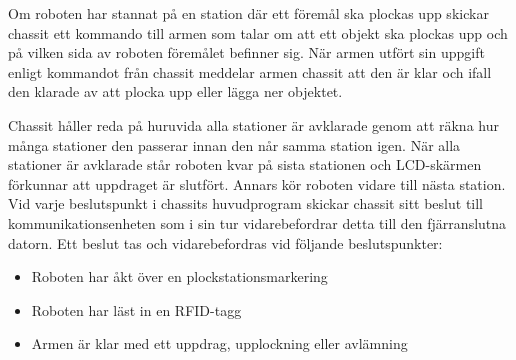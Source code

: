 Om roboten har stannat på en station där ett föremål ska plockas upp skickar chassit ett kommando till armen som talar om att ett objekt ska plockas upp och på vilken sida av roboten föremålet befinner sig. När armen utfört sin uppgift enligt kommandot från chassit meddelar armen chassit att den är klar och ifall den klarade av att plocka upp eller lägga ner objektet. 

Chassit håller reda på huruvida alla stationer är avklarade genom att räkna hur många stationer den passerar innan den når samma station igen. När alla stationer är avklarade står roboten kvar på sista stationen och LCD-skärmen förkunnar att uppdraget är slutfört. Annars kör roboten vidare till nästa station. Vid varje beslutspunkt i chassits huvudprogram skickar chassit sitt beslut till kommunikationsenheten som i sin tur vidarebefordrar detta till den fjärranslutna datorn. Ett beslut tas och vidarebefordras vid följande beslutspunkter: 
\begin{itemize}
\item Roboten har åkt över en plockstationsmarkering
\item Roboten har läst in en RFID-tagg
\item Armen är klar med ett uppdrag, upplockning eller avlämning
\end{itemize}
